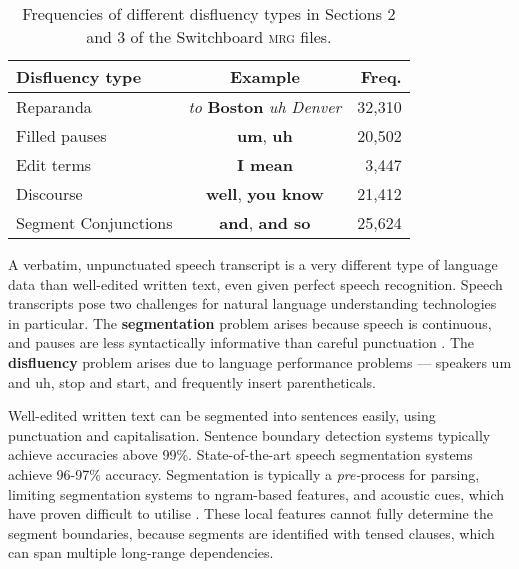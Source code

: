 \documentclass[11pt,letterpaper]{article}
\begin{document}
\begin{table}
    \centering
    \small
    \begin{tabular}{lc|r}
\hline
Disfluency type & Example & Freq. \\
\hline \hline
Reparanda & \emph{to } \textbf{Boston} \emph{uh Denver} & 32,310 \\
Filled pauses    & \textbf{um}, \textbf{uh} & 20,502 \\
Edit terms & \textbf{I mean} & 3,447 \\ 
Discourse  & \textbf{well}, \textbf{you know} & 21,412  \\
Segment Conjunctions & \textbf{and}, \textbf{and so} & 25,624 \\
\hline
\end{tabular}
\caption{\small Frequencies of different disfluency types in Sections 2 and 3 of the
Switchboard \textsc{mrg} files.\label{tab:dfl_freqs}}
\vspace*{-0.5in}
\end{table}


A verbatim, unpunctuated speech transcript is
a very different type of language data than well-edited written text, even
given perfect speech recognition.  Speech transcripts pose
two challenges for natural language understanding technologies in particular.
The \textbf{segmentation} problem arises because speech is continuous, and 
pauses are less syntactically informative than careful punctuation \citep{gregory:04}.
The \textbf{disfluency} problem arises due to language performance problems ---
speakers um and uh, stop and start, and frequently insert parentheticals.


Well-edited written text can be segmented into sentences easily, using punctuation and
capitalisation.  Sentence boundary detection systems typically achieve accuracies
above 99\%.  State-of-the-art speech segmentation systems achieve 96-97\% accuracy.
Segmentation is typically a \emph{pre-}process for parsing, limiting segmentation
systems to ngram-based features, and acoustic cues, which have proven difficult
to utilise \citep{liu:05}.  These local features cannot fully determine the segment
boundaries, because
segments are identified with tensed clauses, which can span multiple long-range dependencies.  
\end{document}

